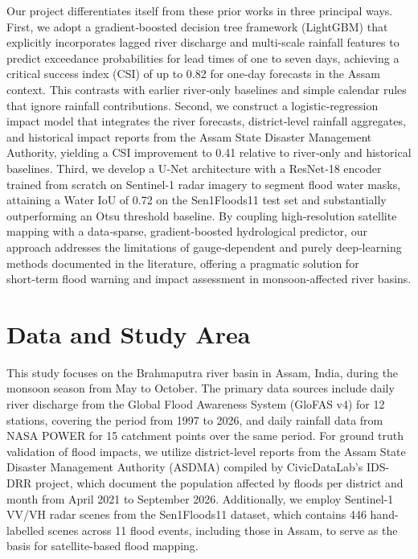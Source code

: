 \documentclass[conference]{IEEEtran}
\begin{document}
Our project differentiates itself from these prior works in three principal ways. First, we adopt a gradient‑boosted decision tree framework (LightGBM) that explicitly incorporates lagged river discharge and multi‑scale rainfall features to predict exceedance probabilities for lead times of one to seven days, achieving a critical success index (CSI) of up to 0.82 for one‑day forecasts in the Assam context. This contrasts with earlier river‑only baselines and simple calendar rules that ignore rainfall contributions. Second, we construct a logistic‑regression impact model that integrates the river forecasts, district‑level rainfall aggregates, and historical impact reports from the Assam State Disaster Management Authority, yielding a CSI improvement to 0.41 relative to river‑only and historical baselines. Third, we develop a U‑Net architecture with a ResNet‑18 encoder trained from scratch on Sentinel‑1 radar imagery to segment flood water masks, attaining a Water IoU of 0.72 on the Sen1Floods11 test set and substantially outperforming an Otsu threshold baseline. By coupling high‑resolution satellite mapping with a data‑sparse, gradient‑boosted hydrological predictor, our approach addresses the limitations of gauge‑dependent and purely deep‑learning methods documented in the literature, offering a pragmatic solution for short‑term flood warning and impact assessment in monsoon‑affected river basins.

\section{Data and Study Area}
This study focuses on the Brahmaputra river basin in Assam, India, during the monsoon season from May to October. The primary data sources include daily river discharge from the Global Flood Awareness System (GloFAS v4) for 12 stations, covering the period from 1997 to 2026, and daily rainfall data from NASA POWER for 15 catchment points over the same period. For ground truth validation of flood impacts, we utilize district-level reports from the Assam State Disaster Management Authority (ASDMA) compiled by CivicDataLab's IDS-DRR project, which document the population affected by floods per district and month from April 2021 to September 2026. Additionally, we employ Sentinel-1 VV/VH radar scenes from the Sen1Floods11 dataset, which contains 446 hand-labelled scenes across 11 flood events, including those in Assam, to serve as the basis for satellite-based flood mapping.
\end{document}
